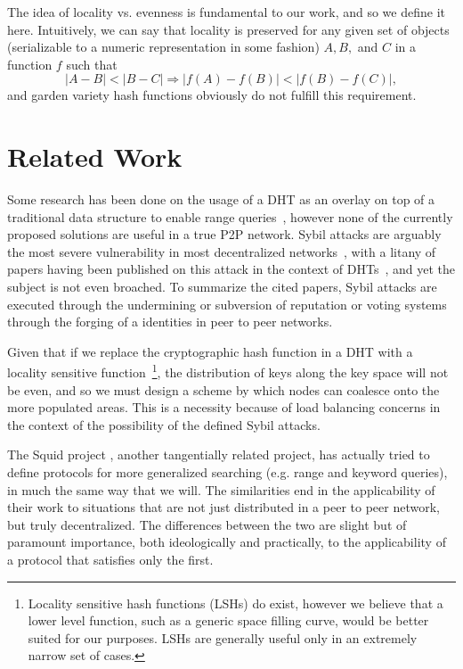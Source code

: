 \documentclass[10pt]{IEEEtran}
\begin{document}
The idea of locality vs. evenness is fundamental to our work, and so we define it here. Intuitively, we can say that locality is preserved for any given set of objects (serializable to a numeric representation in some fashion) $A,B,$ and $C$ in a function $f$ such that
\begin{equation} \label{eq:locality}
|A-B| < |B-C| \Rightarrow |f(A)-f(B)| < |f(B) - f(C)|,
\end{equation}
and garden variety hash functions obviously do not fulfill this requirement.

\section{Related Work}
\par Some research has been done on the usage of a DHT as an overlay on top of a traditional data structure to enable range queries~\cite{Ramabhadran:2004tr,Desnoyers:2008uo}, however none of the currently proposed solutions are useful in a true P2P network. Sybil attacks are arguably the most severe vulnerability in most decentralized networks~\cite{Douceur:2002jr}, with a litany of papers having been published on this attack in the context of DHTs~\cite{LesniewskiLass:2010ue}, and yet the subject is not even broached. To summarize the cited papers, Sybil attacks are executed through the undermining or subversion of reputation or voting systems through the forging of a identities in peer to peer networks.

\par Given that if we replace the cryptographic hash function in a DHT with a locality sensitive function~\footnote{Locality sensitive hash functions (LSHs) do exist, however we believe that a lower level function, such as a generic space filling curve, would be better suited for our purposes. LSHs are generally useful only in an extremely narrow set of cases.}, the distribution of keys along the key space will not be even, and so we must design a scheme by which nodes can coalesce onto the more populated areas. This is a necessity because of load balancing concerns in the context of the possibility of the defined Sybil attacks.

\par The Squid project , another tangentially related project, has actually tried to define protocols for more generalized searching (e.g. range and keyword queries), in much the same way that we will. The similarities end in the applicability of their work to situations that are not just distributed in a peer to peer network, but truly decentralized. The differences between the two are slight but of paramount importance, both ideologically and practically, to the applicability of a protocol that satisfies only the first.
\end{document}

